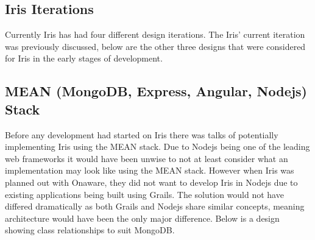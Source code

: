 \documentclass[12pt,a4paper,titlepage]{report}
\begin{document}
\begin{appendices}
\chapter{Iris Iterations}
Currently Iris has had four different design iterations. The Iris’ current iteration was previously discussed, below are the other three designs that were considered for Iris in the early stages of development.

\section{ MEAN (MongoDB, Express, Angular, Nodejs) Stack}

Before any development had started on Iris there was talks of potentially implementing Iris using the MEAN stack. Due to Nodejs being one of the leading web frameworks it would have been unwise to not at least consider what an implementation may look like using the MEAN stack. However when Iris was planned out with Onaware, they did not want to develop Iris in Nodejs due to existing applications being built using Grails. The solution would not have differed dramatically as both Grails and Nodejs share similar concepts, meaning architecture would have been the only major difference. Below is a design showing class relationships to suit MongoDB.


\end{appendices}
\end{document}
